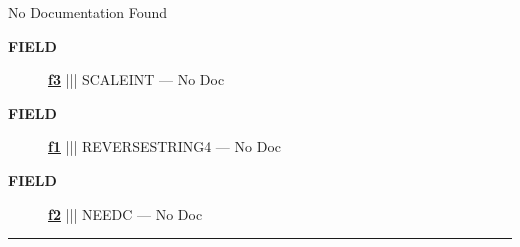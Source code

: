 \par





No Documentation Found







\par
\begin{description}
\item [\colorbox{tagtype}{\color{white} \textbf{\textsf{FIELD}}}] \textbf{\underline{f3}} ||| SCALEINT --- No Doc
\item [\colorbox{tagtype}{\color{white} \textbf{\textsf{FIELD}}}] \textbf{\underline{f1}} ||| REVERSESTRING4 --- No Doc
\item [\colorbox{tagtype}{\color{white} \textbf{\textsf{FIELD}}}] \textbf{\underline{f2}} ||| NEEDC --- No Doc
\end{description}





\rule{\linewidth}{0.5pt}


